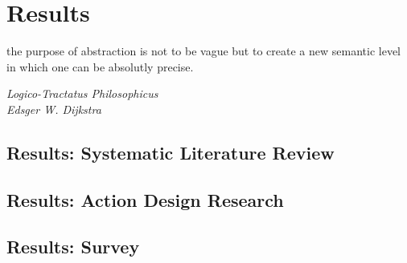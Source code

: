 \chapter{Results}\label{chapter:Results}

\epigraph{the purpose of abstraction is not to be vague but to create a new semantic level in which one can be absolutly precise.}{\textit{Logico-Tractatus Philosophicus\\Edsger W. Dijkstra}}

\section{Results: Systematic Literature Review}\label{section:Results_SLR}
\section{Results: Action Design Research}\label{section:Results_ADR}
\section{Results: Survey}\label{section:Results_Survey}